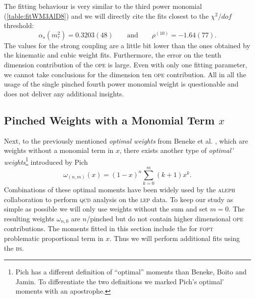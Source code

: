 \documentclass[../../index.tex]{subfiles}
\begin{document}
The fitting behaviour is very similar to the third power monomial
(\cref{table:fitWM3AlD8}) and we will directly cite the fits closest to the
\(\chi^2/dof\) threshold:
\begin{equation}
  \alpha_s(m_\tau^2) = 0.3203(48) \qquad \text{and} \qquad \rho^{(10)}=-1.64(77).
\end{equation}
The values for the strong coupling are a little bit lower than the ones obtained
by the kinematic and cubic weight fits. Furthermore, the error on the tenth
dimension contribution of the \textsc{ope} is large. Even with only one fitting
parameter, we cannot take conclusions for the dimension ten \textsc{ope}
contribution. All in all the usage of the single pinched fourth power monomial
weight is questionable and does not deliver any additional insights.


\subsection{Pinched Weights with a Monomial Term \(x\)}
Next, to the previously mentioned \textit{optimal weights} from Beneke et al.
\cite{Beneke2012}, which are weights without a monomial term in \(x\), there
exists another type of \textit{optimal' weights}\footnote{Pich has a different
  definition of ``optimal'' moments than Beneke, Boito and Jamin. To
  differentiate the two definitions we marked Pich's optimal' moments with an
  apostrophe.} introduced by Pich \cite{LeDiberder1992}
\begin{equation}
  \omega_{(n,m)}(x) = (1-x)^n\sum_{k=0}^m (k+1)x^k.
\end{equation}
Combinations of these optimal moments have been widely used by the
\textsc{aleph} collaboration to perform \textsc{qcd} analysis on the
\textsc{lep} data. To keep our study as simple as possible we will only use
weights without the sum and set \(m=0\). The resulting weights \(\omega_{n,0}\)
are \(n\)\-/pinched but do not contain higher dimensional \textsc{ope}
contributions. The moments fitted in this section include the for \textsc{fopt}
problematic proportional term in \(x\). Thus we will perform additional fits
using the \textsc{bs}.
\end{document}
